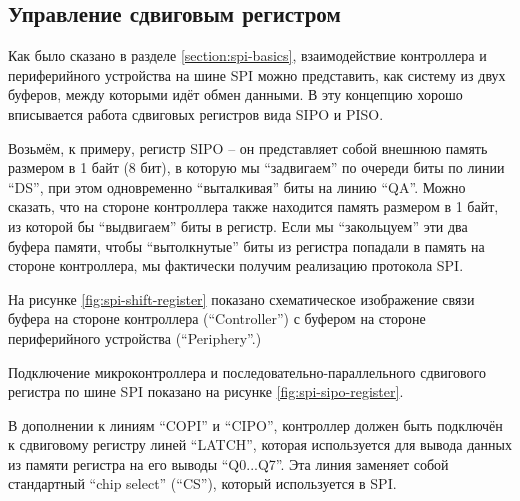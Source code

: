 \documentclass[../sparc.tex]{subfiles}
\begin{document}
\subsection{Управление сдвиговым регистром}

Как было сказано в разделе \ref{section:spi-basics}, взаимодействие контроллера
и периферийного устройства на шине \gls{SPI} можно представить, как систему из
двух буферов, между которыми идёт обмен данными.  В эту концепцию хорошо
вписывается работа сдвиговых регистров вида \gls{SIPO} и \gls{PISO}.

Возьмём, к примеру, регистр \gls{SIPO} -- он представляет собой внешнюю память
размером в 1 байт (8 бит), в которую мы ``задвигаем'' по очереди биты по линии
``DS'', при этом одновременно ``выталкивая'' биты на линию ``QA''.  Можно
сказать, что на стороне контроллера также находится память размером в 1 байт, из
которой бы ``выдвигаем'' биты в регистр.  Если мы ``закольцуем'' эти два буфера
памяти, чтобы ``вытолкнутые'' биты из регистра попадали в память на стороне
контроллера, мы фактически получим реализацию протокола SPI.


На рисунке \ref{fig:spi-shift-register} показано схематическое изображение связи
буфера на стороне контроллера (``Controller'') с буфером на стороне
периферийного устройства (``Periphery''.)


Подключение микроконтроллера и последовательно-параллельного сдвигового регистра
по шине SPI показано на рисунке \ref{fig:spi-sipo-register}.

В дополнении к линиям ``COPI'' и ``CIPO'', контроллер должен быть подключён к
сдвиговому регистру линей ``LATCH'', которая используется для вывода данных из
памяти регистра на его выводы ``Q0...Q7''. Эта линия заменяет собой стандартный
``chip select'' (``CS''), который используется в SPI.
\end{document}
